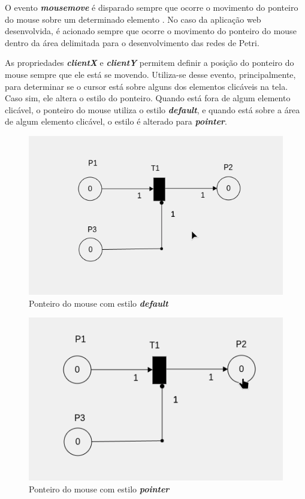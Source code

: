 \documentclass[
	12pt,				%
	openright,			%
	oneside,			%
	a4paper,			%
	english,			%
	brazil				%
	]{abntex2}
\begin{document}
O evento \textbf{\textit{mousemove}} é disparado sempre que ocorre o movimento do ponteiro do mouse sobre um determinado elemento \cite{mdn_mousemove_event}. No caso da aplicação web desenvolvida, é acionado sempre que ocorre o movimento do ponteiro do mouse dentro da área delimitada para o desenvolvimento das redes de Petri. 



As propriedades \textbf{\textit{clientX}} e \textbf{\textit{clientY}} permitem definir a posição do ponteiro do mouse sempre que ele está se movendo. Utiliza-se desse evento, principalmente, para determinar se o cursor está sobre alguns dos elementos clicáveis na tela. Caso sim, ele altera o estilo do ponteiro. Quando está fora de algum elemento clicável, o ponteiro do mouse utiliza o estilo \textbf{\textit{default}}, e quando está sobre a área de algum elemento clicável, o estilo é alterado para \textbf{\textit{pointer}}.

\begin{figure}[ht] 
	\centering
	\includegraphics[scale=0.4]{figuras/mouse_estilo_default.png}
	\caption[Mouse estilo default]{Ponteiro do mouse com estilo \textbf{\textit{default}}}
	\label{fig:mouse_estilo_default}
\end{figure}

\begin{figure}[ht] 
	\centering
	\includegraphics[scale=0.4]{figuras/mouse_estilo_pointer.png}
	\caption[Mouse estilo default]{Ponteiro do mouse com estilo \textbf{\textit{pointer}}}
	\label{fig:mouse_estilo_pointer}
\end{figure}
\end{document}
